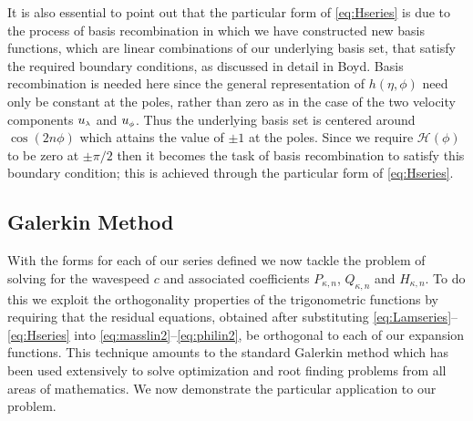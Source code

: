 It is also essential to point out that the particular form of \eqref{eq:Hseries} is due to the process of basis recombination in which we have constructed new basis functions, which are linear combinations of our underlying basis set, that satisfy the required boundary conditions, as discussed in detail in Boyd\cite[page 112]{Boyd:CFSM}. Basis recombination is needed here since the general representation of $h(\eta,\phi)$ need only be constant at the poles, rather than zero as in the case of the two velocity components ${u_{\scriptscriptstyle \lambda}}$ and ${u_{\scriptscriptstyle \phi}}$. Thus the underlying basis set is centered around $\cos(2 n \phi)$ which attains the value of $\pm1$ at the poles. Since we require $\mathcal{H}(\phi)$ to be zero at $\pm \pi/2$ then it becomes the task of basis recombination to satisfy this boundary condition; this is achieved through the particular form of \eqref{eq:Hseries}.

\subsection{Galerkin Method}
\label{subsec:lingalerl}
With the forms for each of our series defined we now tackle the problem of solving for the wavespeed $c$ and associated coefficients $P_{\kappa,n}$, $Q_{\kappa,n}$ and $H_{\kappa,n}$. To do this we exploit the orthogonality properties of the trigonometric functions by requiring that the residual equations, obtained after substituting \eqref{eq:Lamseries}--\eqref{eq:Hseries} into \eqref{eq:masslin2}--\eqref{eq:philin2}, be orthogonal to each of our expansion functions. This technique amounts to the standard Galerkin method which has been used extensively to solve optimization and root finding problems from all areas of mathematics. We now demonstrate the particular application to our problem.

